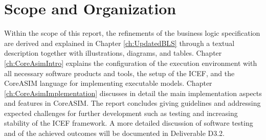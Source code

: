 \section{Scope and Organization}
Within the scope of this report, the refinements of the business logic specification are derived and explained in Chapter \ref{ch:UpdatedBLS} through a textual description together with illustrations, diagrams, and tables. Chapter \ref{ch:CoreAsimIntro} explains the configuration of the execution environment with all necessary software products and tools, the setup of the ICEF, and the CoreASIM language for implementing executable models. Chapter \ref{ch:CoreAsimImplementation} discusses in detail the main implementation aspects and features in CoreASIM. The report concludes giving guidelines and addressing expected challenges for further development such as testing and increasing stability of the ICEF framework. A more detailed discussion of software testing and of the achieved outcomes will be documented in Deliverable D3.2.


\newpage

